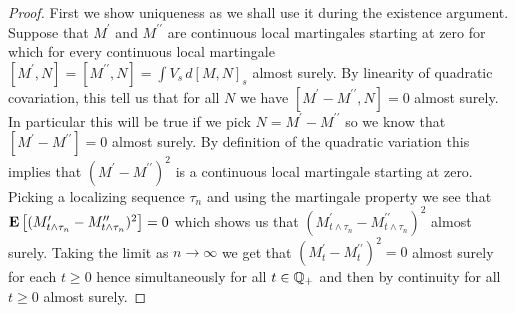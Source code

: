 \begin{proof}
First we show uniqueness as we shall use it during the existence argument.  Suppose that $M^\prime$ and $M^{\prime \prime}$ are continuous local martingales starting at zero for which for every continuous local martingale $[M^\prime, N] = [M^{\prime \prime},N] = \int V_s \, d[M,N]_s$ almost surely.  By linearity of quadratic covariation, this tell us that for all $N$ we have $[M^{\prime} - M^{\prime \prime} ,N]=0$ almost surely.  In particular this will be true if we pick $N = M^{\prime} - M^{\prime \prime}$ so we know that $[M^{\prime} - M^{\prime \prime}] = 0$ almost surely.  By definition of the quadratic variation this implies that $(M^{\prime} - M^{\prime \prime})^2$ is a continuous local martingale starting at zero.  Picking a localizing sequence $\tau_n$ and using the martingale property we see that $\textbf{E}\left[(M_{t \wedge \tau_n}^{\prime} - M_{t \wedge \tau_n}^{\prime \prime})^2\right] =0$ which shows us that $(M_{t \wedge \tau_n}^{\prime} - M_{t \wedge \tau_n}^{\prime \prime})^2$ almost surely.  Taking the limit as $n \to \infty$ we get that $(M_{t}^{\prime} - M_{t}^{\prime \prime})^2=0$ almost surely for each $t \geq 0$ hence simultaneously for all $t \in \mathbb{Q}_+$ and then by continuity for all $t \geq 0$ almost surely.


\end{proof}
